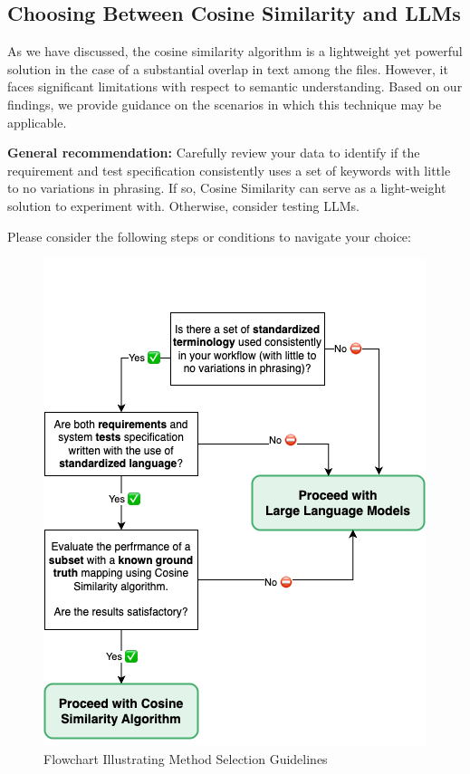 \documentclass[conference]{IEEEtran}
\begin{document}


\subsection{Choosing Between Cosine Similarity and LLMs}

As we have discussed, the cosine similarity algorithm is a lightweight yet powerful solution in the case of a substantial overlap in text among the files. However, it faces significant limitations with respect to semantic understanding. Based on our findings, we provide guidance on the scenarios in which this technique may be applicable.

\textbf{General recommendation:} Carefully review your data to identify if the requirement and test specification consistently uses a set of keywords with little to no variations in phrasing. If so, Cosine Similarity can serve as a light-weight solution to experiment with. Otherwise, consider testing LLMs.

Please consider the following steps or conditions to navigate your choice:

\begin{figure}[H]
    \centering
    \includegraphics[width=0.75\columnwidth]{images/flowchart.png}
    \caption{Flowchart Illustrating Method Selection Guidelines}
    \label{fig:flowchart}
\end{figure}
\end{document}
